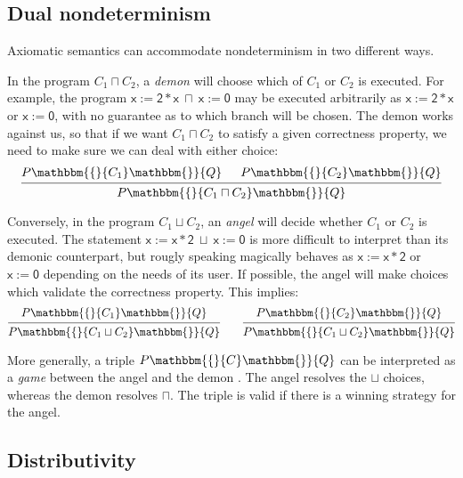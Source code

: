 \documentclass[11pt,oneside,draft]{book}
\theoremstyle{definition}
\newcommand{\kw}[1]{\ensuremath{ \mathsf{#1} }}
\newcommand{\htr}[3]{{ {#1} \mathbbm{\{} {#2} \mathbbm{\}} {#3} }}
\begin{document}
\subsection{Dual nondeterminism}

Axiomatic semantics
can accommodate nondeterminism in two different ways.

In the program $C_1 \sqcap C_2$,
a \emph{demon} will choose which of $C_1$ or $C_2$ is executed.
For example,
the program $\kw{x := 2 * x} \: \sqcap \: \kw{x := 0}$
may be executed arbitrarily as $\kw{x := 2 * x}$ or $\kw{x := 0}$,
with no guarantee as to which branch will be chosen.
The demon works against us,
so that if we want $C_1 \sqcap C_2$ to satisfy
a given correctness property,
we need to make sure we can deal with either choice:
\[
  \begin{prooftree}
    \hypo{\htr{P}{C_1}{Q}}
    \hypo{\htr{P}{C_2}{Q}}
    \infer2{\htr{P}{C_1 \sqcap C_2}{Q}}
  \end{prooftree}
\]

Conversely,
in the program $C_1 \sqcup C_2$,
an \emph{angel} will decide whether $C_1$ or $C_2$ is executed.
The statement $\kw{x := x * 2} \: \sqcup \: \kw{x := 0}$
is more difficult to interpret than its demonic counterpart,
but rougly speaking magically behaves as
$\kw{x := x * 2}$ or $\kw{x := 0}$
depending on the needs of its user.
If possible,
the angel will make choices which validate
the correctness property.
This implies:
\[
  \begin{prooftree}
    \hypo{\htr{P}{C_1}{Q}}
    \infer1{\htr{P}{C_1 \sqcup C_2}{Q}}
  \end{prooftree}
  \qquad
  \begin{prooftree}
    \hypo{\htr{P}{C_2}{Q}}
    \infer1{\htr{P}{C_1 \sqcup C_2}{Q}}
  \end{prooftree}
\]

More generally,
a triple $\htr{P}{C}{Q}$
can be interpreted as a \emph{game}
between the angel and the demon \citep[Chapter 14]{refcal}.
The angel resolves the $\sqcup$ choices,
whereas the demon resolves $\sqcap$.
The triple is valid if there is a winning strategy
for the angel.


\subsection{Distributivity} %
\end{document}
